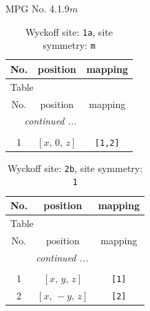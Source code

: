 \documentclass[fleqn,8pt]{jsarticle}
\begin{document}
\setcounter{MaxMatrixCols}{32}

\renewcommand{\tablename}{Table~}
\renewcommand{\figurename}{Figure~}
\begin{center}
\LARGE
MPG No. 4.1.9\quad$m$
\end{center}
\renewcommand{\arraystretch}{1.2}
\begin{longtable}{ccc}
\caption{Wyckoff site: {\tt 1a}, site symmetry: {\tt m}}
 \\
 \hline \hline
No. & position & mapping \\ \hline \endfirsthead

\multicolumn{2}{l}{\tablename\ \thetable{}} \\
 \hline \hline
No. & position & mapping \\ \hline \endhead

 \hline \hline
\multicolumn{2}{r}{\footnotesize\it continued ...} \\ \endfoot

 \hline \hline
\multicolumn{2}{r}{} \\ \endlastfoot

1 & $\left[ x,\, 0,\, z \right]$ & {\tt [1,2]} \\
\end{longtable}
\renewcommand{\arraystretch}{1.2}
\begin{longtable}{ccc}
\caption{Wyckoff site: {\tt 2b}, site symmetry: {\tt 1}}
 \\
 \hline \hline
No. & position & mapping \\ \hline \endfirsthead

\multicolumn{2}{l}{\tablename\ \thetable{}} \\
 \hline \hline
No. & position & mapping \\ \hline \endhead

 \hline \hline
\multicolumn{2}{r}{\footnotesize\it continued ...} \\ \endfoot

 \hline \hline
\multicolumn{2}{r}{} \\ \endlastfoot

1 & $\left[ x,\, y,\, z \right]$ & {\tt [1]} \\ \hline
2 & $\left[ x,\, - y,\, z \right]$ & {\tt [2]} \\
\end{longtable}
\end{document}
